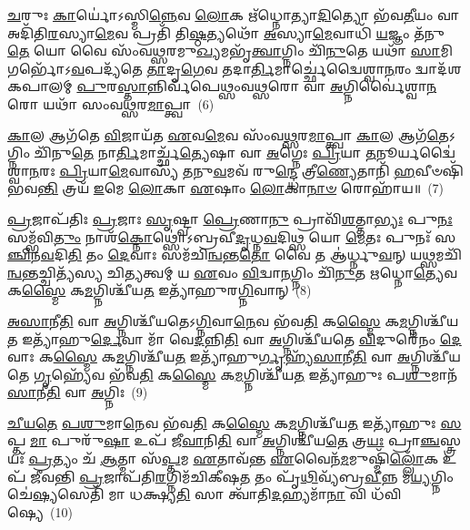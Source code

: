 \-\ul{𑌚}\-𑌰𑍁𑌃 \ul{𑌕𑌾}\-𑌰𑍍𑌯𑍋॑\-𑌽𑌸𑍍𑌮𑌿\-\ul{𑌨𑍍𑌨𑍇}\-𑌵 \ul{𑌲𑍋}\-𑌕 𑌋᳴𑌧𑍍𑌨𑍋𑌤𑍍𑌯𑌾\-\ul{𑌦𑌿}\-𑌤𑍍𑌯𑍋 𑌭᳴𑌵\-\ul{𑌤𑍀}\-𑌯𑌂 𑌵𑌾 𑌅𑌦𑌿᳴𑌤𑌿\-\ul{𑌰}\-𑌸𑍍𑌯𑌾\-\ul{𑌮𑍇}\-𑌵 𑌪𑍍𑌰𑌤𑌿᳴ 𑌤𑌿\-\ul{𑌷𑍍𑌠}\-𑌤𑍍𑌯𑌥𑍋᳴ \ul{𑌅}\-𑌸𑍍𑌯𑌾\-\ul{𑌮𑍇}\-𑌵𑌾𑌧𑌿᳴ \ul{𑌯}\-𑌜𑍍𑌞𑌂 𑌤᳴𑌨𑍁\-\ul{𑌤𑍇} 𑌯𑍋 𑌵𑍈 𑌸𑌂᳴𑌵\-\ul{𑌥𑍍𑌸}\-𑌰𑌮𑍁\-\ul{𑌖𑍍𑌯}\-𑌮𑌭𑍃᳴\-\ul{𑌤𑍍𑌵𑌾}\-𑌗𑍍𑌨𑌿𑌂 𑌚𑌿᳴\-\ul{𑌨𑍁}\-𑌤𑍇 𑌯𑌥𑌾᳴ \ul{𑌸𑌾}\-𑌮𑌿 𑌗𑌰𑍍𑌭𑍋᳴\-𑌽\-\ul{𑌵}\-𑌪𑌦𑍍𑌯᳴𑌤𑍇 \ul{𑌤𑌾}\-𑌦𑍃\-\ul{𑌗𑍇}\-𑌵 𑌤𑌦𑌾\-\ul{𑌰𑍍𑌤𑌿}\-𑌮𑌾𑌰𑍍𑌚𑍍𑌛𑍇॑𑌦𑍍𑌵𑍈𑌶𑍍𑌵𑌾\-\ul{𑌨}\-𑌰𑌂 𑌦𑍍𑌵𑌾𑌦᳴𑌶\-𑌕𑌪𑌾𑌲𑌮𑍍 \ul{𑌪𑍁}\-𑌰\-\ul{𑌸𑍍𑌤𑌾}\-𑌨𑍍𑌨𑌿𑌰𑍍𑌵᳴𑌪𑍇𑌥𑍍𑌸𑌂𑌵\-\ul{𑌥𑍍𑌸}\-𑌰𑍋 𑌵𑌾 \ul{𑌅}\-𑌗𑍍𑌨𑌿𑌰𑍍𑌵𑍈॑𑌶𑍍𑌵𑌾\-\ul{𑌨}\-𑌰𑍋 𑌯𑌥𑌾᳴ 𑌸𑌂𑌵\-\ul{𑌥𑍍𑌸}\-𑌰\-\ul{𑌮𑌾}\-𑌪𑍍𑌤𑍍𑌵𑌾~(6)

\-\ul{𑌕𑌾}\-𑌲 𑌆𑌗᳴𑌤𑍇 \ul{𑌵𑌿}\-𑌜𑌾𑌯᳴𑌤 \ul{𑌏}\-𑌵\-\ul{𑌮𑍇}\-𑌵 𑌸𑌂᳴𑌵\-\ul{𑌥𑍍𑌸}\-𑌰\-\ul{𑌮𑌾}\-𑌪𑍍𑌤𑍍𑌵𑌾 \ul{𑌕𑌾}\-𑌲 𑌆𑌗᳴\-\ul{𑌤𑍇}\-\-𑌽𑌗𑍍𑌨𑌿𑌂 𑌚𑌿᳴𑌨𑍁\-\ul{𑌤𑍇} 𑌨𑌾\-\ul{𑌰𑍍𑌤𑌿}\-𑌮𑌾𑌰𑍍𑌚𑍍𑌛᳴\-\ul{𑌤𑍍𑌯𑍇}\-𑌷𑌾 𑌵𑌾 \ul{𑌅}\-𑌗𑍍𑌨𑍇𑌃 \ul{𑌪𑍍𑌰𑌿}\-𑌯𑌾 \ul{𑌤}\-𑌨𑍂𑌰𑍍𑌯𑌦𑍍𑌵𑍈॑𑌶𑍍𑌵𑌾\-\ul{𑌨}\-𑌰𑌃 \ul{𑌪𑍍𑌰𑌿}\-𑌯𑌾\-\ul{𑌮𑍇}\-𑌵𑌾𑌸𑍍𑌯᳴ \ul{𑌤}\-𑌨𑍁\-\ul{𑌵}\-𑌮𑌵᳴ 𑌰𑍁\-\ul{𑌨𑍍𑌦𑍍𑌧𑍇} 𑌤𑍍𑌰𑍀\-\ul{𑌣𑍍𑌯𑍇}\-𑌤𑌾𑌨𑌿᳴ \ul{𑌹}\-𑌵𑍀𑍞𑌷𑌿᳴ 𑌭𑌵\-\ul{𑌨𑍍𑌤𑌿} 𑌤𑍍𑌰𑌯᳴ \ul{𑌇}\-𑌮𑍇 \ul{𑌲𑍋}\-𑌕𑌾 \ul{𑌏}\-𑌷𑌾𑌂 \ul{𑌲𑍋}\-𑌕𑌾\-\ul{𑌨𑌾}\-\-\ul{𑍞} 𑌰𑍋𑌹𑌾᳴𑌯॥~(7)

{\anuvakamend[{\-\ul{𑌯}\-𑌦𑍍𑌰𑌿𑌯᳴\-\ul{𑌙𑍍𑌵𑌾}\-𑌯𑍁𑌰𑍍𑌯𑌚𑍍𑌛𑍍𑌮᳴\-\ul{𑌶𑍍𑌰𑍁}\-𑌣𑌸𑍍𑌤\-\ul{𑌦𑍍𑌵𑌾}\-𑌯𑍋\-\ul{𑌰𑍍𑌨𑌿}\-𑌰𑍍𑌵𑌪᳴𑌤𑌿 \ul{𑌦𑍇}\-𑌵\-\ul{𑌤𑌾}\-𑌸𑍍𑌤𑌸𑍍𑌮𑌾᳴\-\ul{𑌦𑌾}\-𑌪𑍍𑌤𑍍𑌵𑌾𑌷𑍍𑌟𑌾𑌤𑍍𑌰𑌿𑍞᳴𑌶𑌚𑍍𑌚}]}%

\-\ul{𑌪𑍍𑌰}\-𑌜𑌾𑌪᳴𑌤𑌿𑌃 \ul{𑌪𑍍𑌰}\-𑌜𑌾𑌃 \ul{𑌸𑍃}\-𑌷𑍍𑌟𑍍𑌵𑌾 \ul{𑌪𑍍𑌰𑍇}\-𑌣𑌾\-\ul{𑌨𑍁} 𑌪𑍍𑌰𑌾𑌵𑌿᳴\-\ul{𑌶}\-𑌤𑍍𑌤𑌾\-\ul{𑌭𑍍𑌯𑌃} 𑌪𑍁\-\ul{𑌨𑌃} 𑌸𑌮𑍍𑌭᳴𑌵𑌿\-\ul{𑌤𑍁𑌂} 𑌨𑌾𑌶᳴\-\ul{𑌕𑍍𑌨𑍋}\-𑌥𑍍𑌸𑍋॑\-𑌽𑌬𑍍𑌰𑌵𑍀\-\ul{𑌦𑍃}\-𑌧𑍍𑌨\-\ul{𑌵}\-𑌦𑌿𑌥𑍍𑌸 𑌯𑍋 \ul{𑌮𑍇}\-𑌤𑌃 𑌪𑍁𑌨𑌃᳴ 𑌸\-\ul{𑌞𑍍𑌚𑌿}\-𑌨\-\ul{𑌵}\-𑌦𑌿\-\ul{𑌤𑌿} 𑌤𑌂 \ul{𑌦𑍇}\-𑌵𑌾𑌃 𑌸𑌮᳴𑌚𑌿\-\ul{𑌨𑍍𑌵}\-𑌨𑍍𑌤\-\ul{𑌤𑍋} 𑌵𑍈 𑌤 𑌆॑𑌰𑍍𑌧𑍍𑌨𑍁\-\ul{𑌵}\-𑌨𑍍 𑌯\-\ul{𑌥𑍍𑌸}\-𑌮𑌚𑌿᳴\-\ul{𑌨𑍍𑌵}\-𑌨𑍍𑌤𑌚𑍍𑌚𑌿𑌤𑍍𑌯᳴𑌸𑍍𑌯 𑌚𑌿\-\ul{𑌤𑍍𑌯}\-𑌤𑍍𑌵𑌮𑍍 𑌯 \ul{𑌏}\-𑌵𑌂 \ul{𑌵𑌿}\-𑌦𑍍𑌵𑌾\-\ul{𑌨}\-𑌗𑍍𑌨𑌿𑌂 𑌚𑌿᳴\-\ul{𑌨𑍁}\-𑌤 \ul{𑌋}\-𑌧𑍍𑌨𑍋\-\ul{𑌤𑍍𑌯𑍇}\-𑌵 𑌕\-\ul{𑌸𑍍𑌮𑍈} 𑌕\-\ul{𑌮}\-𑌗𑍍𑌨𑌿𑌶𑍍𑌚𑍀᳴𑌯\-\ul{𑌤} 𑌇𑌤𑍍𑌯𑌾᳴𑌹𑍁𑌰\-\ul{𑌗𑍍𑌨𑌿}\-𑌵𑌾𑌨𑍍~(8)

\-\ul{𑌅}\-\-\ul{𑌸𑌾}\-𑌨𑍀\-\ul{𑌤𑌿} 𑌵𑌾 \ul{𑌅}\-𑌗𑍍𑌨𑌿𑌶𑍍𑌚𑍀᳴𑌯𑌤𑍇\-𑌽\-\ul{𑌗𑍍𑌨𑌿}\-𑌵𑌾\-\ul{𑌨𑍇}\-𑌵 𑌭᳴𑌵\-\ul{𑌤𑌿} 𑌕\-\ul{𑌸𑍍𑌮𑍈} 𑌕\-\ul{𑌮}\-𑌗𑍍𑌨𑌿𑌶𑍍𑌚𑍀᳴𑌯\-\ul{𑌤} 𑌇𑌤𑍍𑌯𑌾᳴𑌹𑍁\-\ul{𑌰𑍍𑌦𑍇}\-𑌵𑌾 𑌮𑌾᳴ 𑌵𑍇\-\ul{𑌦}\-𑌨𑍍𑌨𑌿\-\ul{𑌤𑌿} 𑌵𑌾 \ul{𑌅}\-𑌗𑍍𑌨𑌿𑌶𑍍𑌚𑍀᳴𑌯𑌤𑍇 \ul{𑌵𑌿}\-𑌦𑍁𑌰𑍇᳴𑌨𑌂 \ul{𑌦𑍇}\-𑌵𑌾𑌃 𑌕\-\ul{𑌸𑍍𑌮𑍈} 𑌕\-\ul{𑌮}\-𑌗𑍍𑌨𑌿𑌶𑍍𑌚𑍀᳴𑌯\-\ul{𑌤} 𑌇𑌤𑍍𑌯𑌾᳴𑌹𑍁\-\ul{𑌰𑍍𑌗𑍃}\-𑌹𑍍𑌯᳴\-\ul{𑌸𑌾}\-𑌨𑍀\-\ul{𑌤𑌿} 𑌵𑌾 \ul{𑌅}\-𑌗𑍍𑌨𑌿𑌶𑍍𑌚𑍀᳴𑌯𑌤𑍇 \ul{𑌗𑍃}\-𑌹𑍍𑌯𑍇᳴𑌵 𑌭᳴𑌵\-\ul{𑌤𑌿} 𑌕\-\ul{𑌸𑍍𑌮𑍈} 𑌕\-\ul{𑌮}\-𑌗𑍍𑌨𑌿𑌶𑍍𑌚𑍀᳴𑌯\-\ul{𑌤} 𑌇𑌤𑍍𑌯𑌾᳴𑌹𑍁𑌃 𑌪\-\ul{𑌶𑍁}\-𑌮𑌾𑌨᳴\-\ul{𑌸𑌾}\-𑌨𑍀\-\ul{𑌤𑌿} 𑌵𑌾 \ul{𑌅}\-𑌗𑍍𑌨𑌿𑌃~(9)

\-\ul{𑌚𑍀}\-\-\ul{𑌯}\-\-\ul{𑌤𑍇} \ul{𑌪}\-\-\ul{𑌶𑍁}\-𑌮𑌾\-\ul{𑌨𑍇}\-𑌵 𑌭᳴𑌵\-\ul{𑌤𑌿} 𑌕\-\ul{𑌸𑍍𑌮𑍈} 𑌕\-\ul{𑌮}\-𑌗𑍍𑌨𑌿𑌶𑍍𑌚𑍀᳴𑌯\-\ul{𑌤} 𑌇𑌤𑍍𑌯𑌾᳴𑌹𑍁𑌃 \ul{𑌸}\-𑌪𑍍𑌤 \ul{𑌮𑌾} 𑌪𑍁𑌰𑍁᳴\-\ul{𑌷𑌾} 𑌉𑌪᳴ 𑌜𑍀\-\ul{𑌵𑌾}\-𑌨𑌿\-\ul{𑌤𑌿} 𑌵𑌾 \ul{𑌅}\-𑌗𑍍𑌨𑌿𑌶𑍍𑌚𑍀᳴𑌯\-\ul{𑌤𑍇} 𑌤𑍍𑌰\-\ul{𑌯𑌃} 𑌪𑍍𑌰𑌾\-\ul{𑌞𑍍𑌚}\-𑌸𑍍𑌤𑍍𑌰𑌯𑌃᳴ \ul{𑌪𑍍𑌰}\-𑌤𑍍𑌯𑌂 𑌚᳴ \ul{𑌆}\-𑌤𑍍𑌮𑌾 𑌸᳴\-\ul{𑌪𑍍𑌤}\-𑌮 \ul{𑌏}\-𑌤𑌾𑌵᳴𑌨𑍍𑌤 \ul{𑌏}\-𑌵𑍈𑌨᳴\-\ul{𑌮}\-𑌮𑍁𑌷𑍍𑌮𑌿᳴\-\ul{𑌲𑍍𑌲𑍋𑌁}\-𑌕 𑌉𑌪᳴ 𑌜𑍀𑌵𑌨𑍍𑌤𑌿 \ul{𑌪𑍍𑌰}\-𑌜𑌾𑌪᳴𑌤𑌿\-\ul{𑌰}\-𑌗𑍍𑌨𑌿𑌮᳴𑌚𑌿𑌕𑍀𑌷\-\ul{𑌤} 𑌤𑌂 𑌪𑍃᳴\-\ul{𑌥𑌿}\-𑌵𑍍𑌯᳴𑌬𑍍𑌰\-\ul{𑌵𑍀}\-𑌨𑍍𑌨 𑌮\-\ul{𑌯𑍍𑌯}\-𑌗𑍍𑌨𑌿𑌂 𑌚𑍇॑\-\ul{𑌷𑍍𑌯}\-𑌸𑍇𑌤𑌿᳴ 𑌮𑌾 𑌧𑌕𑍍𑌷𑍍𑌯\-\ul{𑌤𑌿} 𑌸𑌾 𑌤𑍍𑌵𑌾᳴𑌤𑌿\-\ul{𑌦}\-𑌹𑍍𑌯𑌮𑌾᳴\-\ul{𑌨𑌾} 𑌵𑌿 𑌧᳴𑌵𑌿𑌷𑍍𑌯𑍇~(10)

